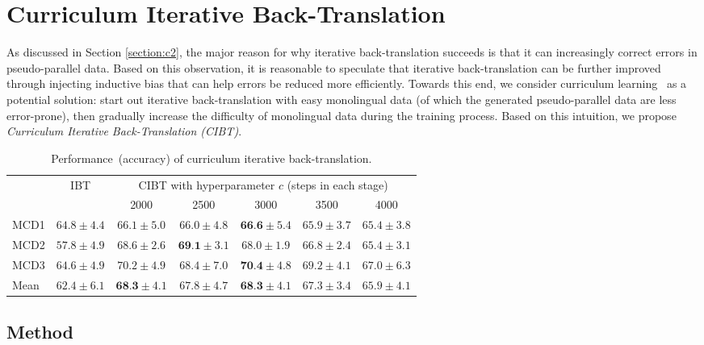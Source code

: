 \documentclass[letterpaper]{article} %
\begin{document}
\section{Curriculum Iterative Back-Translation}
\label{section:c3}

As discussed in Section \ref{section:c2}, the major reason for why iterative back-translation succeeds is that it can increasingly correct errors in pseudo-parallel data.
Based on this observation, it is reasonable to speculate that iterative back-translation can be further improved through injecting inductive bias that can help errors be reduced more efficiently.
Towards this end, we consider curriculum learning~\cite{bengio2009curriculum} as a potential solution: start out iterative back-translation with easy monolingual data (of which the generated pseudo-parallel data are less error-prone), then gradually increase the difficulty of monolingual data during the training process.
Based on this intuition, we propose \emph{Curriculum Iterative Back-Translation (CIBT)}.

\begin{table}[t]
\small
    \centering
    \caption{Performance~(accuracy) of curriculum iterative back-translation.}
	\begin{tabular}{lcccccc}
	    \hline
    	\multirow{2}{*}{} & \multirow{2}{*}{IBT} & \multicolumn{5}{c}{CIBT with hyperparameter $c$ (steps in each stage)} \\ \cline{3-7}
    	 &  & 2000 & 2500 & 3000 & 3500 & 4000 \\ \cline{1-1} \cline{2-2} \cline{3-7}
         MCD1 & $  64.8 \pm 4.4 $ & $  66.1 \pm 5.0 $ & $  66.0 \pm 4.8 $ & $  \textbf{66.6} \pm 5.4 $ & $  65.9 \pm 3.7 $ & $  65.4 \pm 3.8 $ \\ 
        MCD2 & $  57.8 \pm 4.9 $ & $  68.6 \pm 2.6 $ & $  \textbf{69.1} \pm 3.1 $ & $  68.0 \pm 1.9 $ & $  66.8 \pm 2.4 $ & $  65.4 \pm 3.1 $ \\
        MCD3 & $  64.6 \pm 4.9 $ & $  70.2 \pm 4.9 $ & $  68.4 \pm 7.0 $ & $  \textbf{70.4} \pm 4.8 $ & $  69.2 \pm 4.1 $ & $  67.0 \pm 6.3 $ \\ 
        Mean & $  62.4 \pm 6.1 $ & $  \textbf{68.3} \pm 4.1 $ & $  67.8 \pm 4.7 $ & $  \textbf{68.3} \pm 4.1 $ & $  67.3 \pm 3.4 $ & $  65.9 \pm 4.1 $ \\ \hline
    \end{tabular}
	\label{cl_results_summary}
\end{table}

\subsection{Method}
\end{document}
